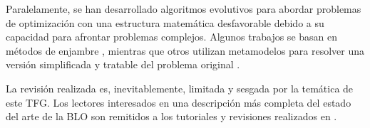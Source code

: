 
Paralelamente, se han desarrollado algoritmos evolutivos para abordar problemas de optimización con una estructura matemática desfavorable debido a su capacidad para afrontar problemas complejos. Algunos trabajos se basan en métodos de enjambre \cite{sinha2014bilevel}, mientras que otros utilizan metamodelos para resolver una versión simplificada y tratable del problema original \cite{wang2005evolutionary}.

La revisión realizada es, inevitablemente, limitada y sesgada por la temática de este TFG. Los lectores interesados en una descripción más completa del estado del arte de la BLO son remitidos a los tutoriales y revisiones realizados en \cite{sinha2018review,colson2007overview,bard2013practical}.